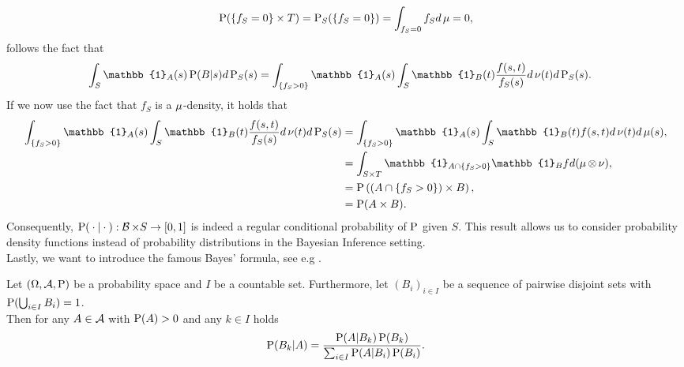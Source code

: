 \begin{align*}
\operatorname{\text{P}}(\{f_S = 0\} \times T) = \operatorname{\text{P}}_S(\{f_S = 0\}) = \int_{f_S = 0} f_S d\operatorname{\mu} = 0,
\end{align*}
follows the fact that
\begin{align*}
\int_S \mathbb{1}_A(s) \prob(B|s)d\prob_S(s) &= \int_{\{f_S > 0\}} \mathbb{1}_A(s) \int_S \mathbb{1}_B(t) \frac{f(s, t)}{f_S(s)} d\n(t) d\prob_S(s).
\end{align*}
If we now use the fact that $f_S$ is a $\operatorname{\mu}$-density, it holds that
\begin{align*}
\int_{\{f_S > 0\}} \mathbb{1}_A(s) \int_S \mathbb{1}_B(t) \frac{f(s, t)}{f_S(s)} d\n(t) d\prob_S(s) &= \int_{\{f_S >0\}} \mathbb{1}_A(s) \int_S \mathbb{1}_B(t) f(s, t) d\n(t) d\m(s),\\
&= \int_{S \times T} \mathbb{1}_{A \cap \{f_S > 0\}} \mathbb{1}_Bf d(\m \otimes \n),\\
&= \prob\left( (A \cap \{f_S > 0\}) \times B \right),\\
&= \prob (A \times B).
\end{align*}
Consequently, $\operatorname{\text{P}}({}\cdot{} |{}\cdot{}):\operatorname{\mathcal{B}} \times S\to [0, 1]$ is indeed a regular conditional probability of $\operatorname{\text{P}}$ given $S$. This result allows us to consider probability density functions instead of probability distributions in the Bayesian Inference setting.\\
Lastly, we want to introduce the famous Bayes' formula, see e.g \cite[Theorem~8.7]{klenke2013probability}.

\begin{theorem}\label{theorem:bayes_rule}
Let $(\Omega, \operatorname{\mathcal{A}}, \operatorname{\text{P}})$ be a probability space and $I$ be a countable set. Furthermore, let $(B_i)_{i\in I}$ be a sequence of pairwise disjoint sets with $\operatorname{\text{P}} (\bigcup_{i\in I} B_i) = 1$.\\
Then for any $A\in\operatorname{\mathcal{A}}$ with $\operatorname{\text{P}}(A) > 0$ and any $k\in I$ holds
\begin{align*}
\operatorname{\text{P}}(B_k | A) = \frac{\operatorname{\text{P}}(A | B_k) \operatorname{\text{P}}(B_k)}{\sum_{i \in I} \operatorname{\text{P}}(A | B_i) \operatorname{\text{P}}(B_i)}.
\end{align*}
\end{theorem}

